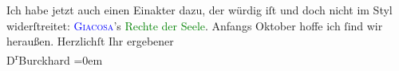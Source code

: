            \pstart
           {\pb}Ich habe jetzt auch einen Einakter
                    dazu, der würdig iſt und doch nicht im Styl widerſtreitet: \textcolor{blue}{\textsc{Giacosa}}{}\ledrightnote{\textcolor{blue}{Giuseppe Giacosa}}’s \textcolor{green}{Rechte der Seele}{}\ledrightnote{\textcolor{green}{Rechte der Seele}}.\pend
           \pstart
           Anfangs Oktober hoffe ich ſind wir heraußen.\pend
           \pstart
           Herzlichſt Ihr ergebener{\\[\baselineskip]}\spacefill\mbox{D\textsuperscript{r}Burckhard}\pend
           \leftskip=0em{}\endnumbering{}  
      